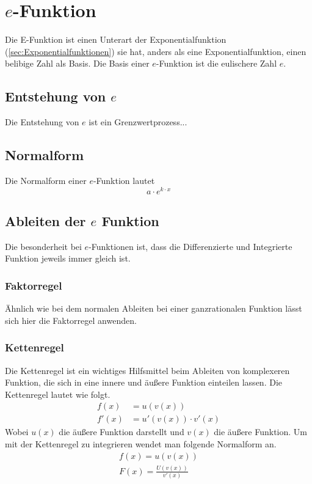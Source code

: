 \pagebreak
\section{$e$-Funktion}\label{sec:e-Funktion}
Die E-Funktion ist einen Unterart der Exponentialfunktion (\ref{sec:Exponentialfunktionen}) sie hat, anders als eine Exponentialfunktion, einen belibige Zahl als Basis. Die Basis einer $e$-Funktion ist die eulischere Zahl $e$. 
\subsection{Entstehung von $e$} \label{sec:E-Funktion/Entstehung von e}
Die Entstehung von $e$ ist ein Grenzwertprozess...

\subsection{Normalform}\label{sec:E-Funktion/Normalform}
Die Normalform einer $e$-Funktion lautet
\[a\cdot e^{k\cdot x}\]

\subsection{Ableiten der $e$ Funktion}\label{sec:E-Funktion/Ableiten der e Funktion}
Die besonderheit bei $e$-Funktionen ist, dass die Differenzierte und Integrierte Funktion jeweils immer gleich ist. 
\subsubsection{Faktorregel}\label{sec:E-Funktion/Normalform} 
Ähnlich wie bei dem normalen Ableiten bei einer ganzrationalen Funktion lässt sich hier die Faktorregel anwenden.
\subsubsection{Kettenregel}
Die Kettenregel ist ein wichtiges Hilfsmittel beim Ableiten von komplexeren Funktion, die sich in eine innere und äußere Funktion einteilen lassen. Die Kettenregel lautet wie folgt.
\begin{align*}
	f(x)&=u(v(x))\\
	f'(x)&=u'(v(x))\cdot v'(x)
\end{align*}
Wobei $u(x)$ die äußere Funktion darstellt und $v(x)$ die äußere Funktion. 
Um mit der Kettenregel zu integrieren wendet man folgende Normalform an. 
\begin{align*}
	f(x)=u(v(x))\\
	F(x)=\frac{U(v(x))}{v'(x)}
\end{align*}

